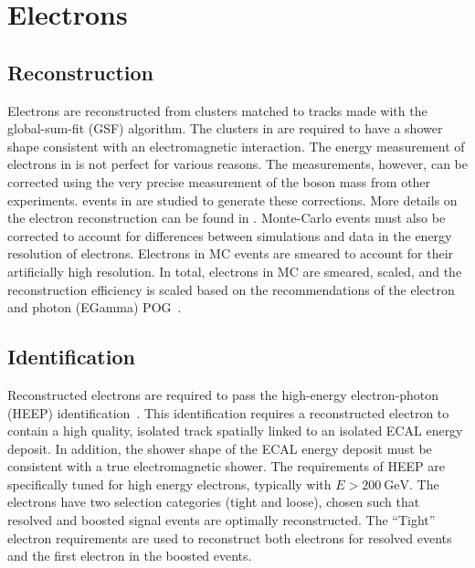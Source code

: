 
\section{Electrons}
\label{sec:electron_reco}
\subsection{Reconstruction}
Electrons are reconstructed from \ECAL clusters matched to tracks made with the global-sum-fit (GSF) algorithm. The clusters in \ECAL are required to have a shower shape consistent with an electromagnetic interaction.
The energy measurement of electrons in \CMS is not perfect for various reasons. The measurements, however, can be corrected using the very precise measurement of the \Z boson mass from other experiments. \DYtoee events in \CMS are studied to generate these corrections. More details on the electron reconstruction can be found in \cite{particleFlow}\cite{electrons_8tev}.
Monte-Carlo events must also be corrected to account for differences between simulations and data in the energy resolution of electrons. Electrons in MC events are smeared to account for their artificially high resolution.
In total, electrons in MC are smeared, scaled, and the reconstruction efficiency is scaled based on the recommendations of the electron and photon (EGamma) POG~\cite{EGMsmearings, ELERECOSF, electrons_8tev}.

\subsection{Identification}
Reconstructed electrons are required to pass the high-energy electron-photon (HEEP) identification~\cite{HEEPID}.
This identification requires a reconstructed electron to contain a high quality, isolated track spatially linked to an isolated ECAL energy deposit.
In addition, the shower shape of the ECAL energy deposit must be consistent with a true electromagnetic shower. The requirements of HEEP are specifically tuned for high energy electrons, typically with $E > \SI{200}{\GeV}$.
The electrons have two selection categories (tight and loose), chosen such that resolved and boosted signal events are optimally reconstructed.
The ``Tight'' electron requirements are used to reconstruct both electrons for resolved events and the first electron in the boosted events.

